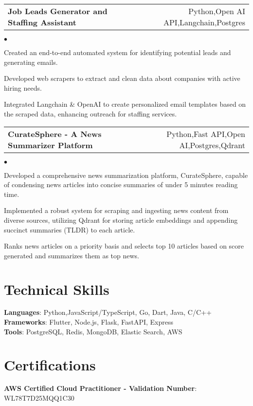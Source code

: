 \documentclass[margin, 11pt]{res}
\makeatletter
\newcommand{\resumeSubSubheading}[2]{
\begin{tabular*}{1.01\textwidth}{@{\hspace{-4pt}}l @{\extracolsep{\fill}} r}
    #1 & #2 
\end{tabular*}\vspace{-7pt}
}
\newenvironment{list2}{
	\begin{list}{$\bullet$}{%
	    \small
		\setlength{\itemsep}{0in}
		\setlength{\parsep}{0in} \setlength{\parskip}{0in}
		\setlength{\topsep}{0in} \setlength{\partopsep}{0in}
		\setlength{\leftmargin}{0.2in}}}{\end{list}}
\makeatother
\begin{document}
\begin{resume}
\resumeSubSubheading{\textbf{Job Leads Generator and Staffing Assistant}}
{Python,Open AI API,Langchain,Postgres}

\begin{list2}
        \item Created an end-to-end automated system for identifying potential leads and generating emails.
        \item Developed web scrapers to extract and clean data about companies with active hiring needs.
        \item Integrated Langchain \& OpenAI to create personalized email templates based on the scraped data, enhancing outreach for staffing services.
\end{list2}

\resumeSubSubheading{\textbf{CurateSphere - A News Summarizer Platform}}
{Python,Fast API,Open AI,Postgres,Qdrant}

\begin{list2}
    \item Developed a comprehensive news summarization platform, CurateSphere, capable of condensing news articles into concise summaries of under 5 minutes reading time.
    \item Implemented a robust system for scraping and ingesting news content from diverse sources, utilizing Qdrant for storing article embeddings and appending succinct summaries (TLDR) to each article.
    \item Ranks news articles on a priority basis and selects top 10 articles based on score generated and summarizes them as top news.
\end{list2}


\section{\sc Technical Skills}

\textbf{Languages}{: Python,JavaScript/TypeScript, Go, Dart, Java, C/C++} \\
\textbf{Frameworks}{: Flutter, Node.js, Flask, FastAPI, Express} \\
\textbf{Tools}{: PostgreSQL, Redis, MongoDB, Elastic Search, AWS} 

\section{\sc Certifications}
\textbf{AWS Certified Cloud Practitioner - Validation Number}{: WL78T7D25MQQ1C30} \\

\vspace{0.2in}

\end{resume}
\end{document}
